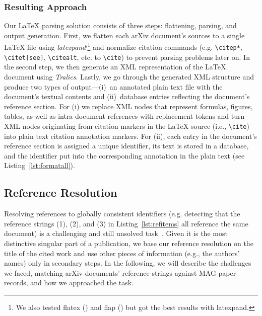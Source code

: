 \subsubsection{Resulting Approach}
Our \LaTeX{} parsing solution consists of three steps: flattening, parsing, and output generation. First, we flatten each arXiv document's sources to a single \LaTeX{} file using \textit{latexpand}\textsuperscript{,}\footnote{We also tested flatex () and flap () but got the best results with latexpand.} and normalize citation commands (e.g. \texttt{\textbackslash citep*}, \texttt{\textbackslash citet[see]}, \texttt{\textbackslash citealt}, etc. to \texttt{\textbackslash cite}) to prevent parsing problems later on. In the second step, we then generate an XML representation of the \LaTeX{} document using \textit{Tralics}. Lastly, we go through the generated XML structure and produce two types of output---(i)~an annotated plain text file with the document's textual contents and (ii)~database entries reflecting the document's reference section. For (i) we replace XML nodes that represent formulas, figures, tables, as well as intra-document references with replacement tokens and turn XML nodes originating from citation markers in the \LaTeX{} source (i.e., \texttt{\textbackslash cite}) into plain text citation annotation markers. For (ii), each entry in the document's reference section is assigned a unique identifier, its text is stored in a database, and the identifier put into the corresponding annotation in the plain text (see Listing~\ref{lst:formatall}).

\subsection{Reference Resolution}
\label{sec:refresol}
Resolving references to globally consistent identifiers (e.g. detecting that the reference strings (1), (2), and (3) in Listing~\ref{lst:refitems} all reference the same document) is a challenging and still unsolved task~\cite{Nasar2018}. Given it is the most distinctive singular part of a publication, we base our reference resolution on the title of the cited work and use other pieces of information (e.g., the authors' names) only in secondary steps. In the following, we will describe the challenges we faced, matching arXiv documents' reference strings against MAG paper records, and how we approached the task.

